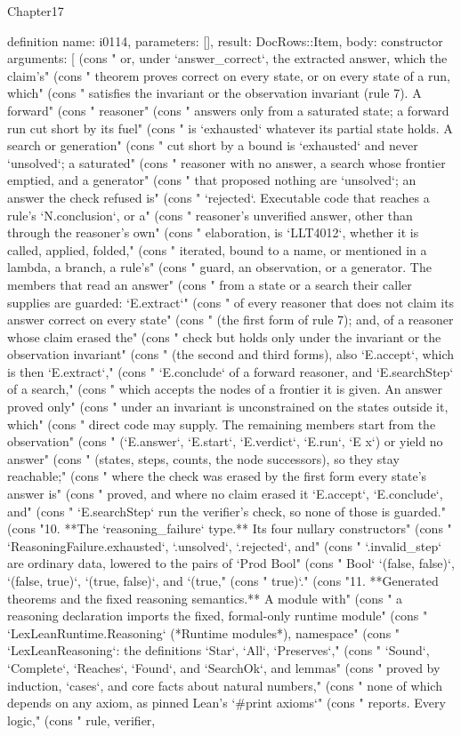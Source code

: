 \begin{lexlean}{Chapter17}
\begin{semanticmodule}
definition{
  name: i0114,
  parameters: [],
  result: DocRows::Item,
  body: constructor{
    arguments: [
      (cons "   or, under `answer_correct`, the extracted answer, which the claim's" (cons "   theorem proves correct on every state, or on every state of a run, which" (cons "   satisfies the invariant or the observation invariant (rule 7). A forward" (cons "   reasoner" (cons "   answers only from a saturated state; a forward run cut short by its fuel" (cons "   is `exhausted` whatever its partial state holds. A search or generation" (cons "   cut short by a bound is `exhausted` and never `unsolved`; a saturated" (cons "   reasoner with no answer, a search whose frontier emptied, and a generator" (cons "   that proposed nothing are `unsolved`; an answer the check refused is" (cons "   `rejected`. Executable code that reaches a rule's `N.conclusion`, or a" (cons "   reasoner's unverified answer, other than through the reasoner's own" (cons "   elaboration, is `LLT4012`, whether it is called, applied, folded," (cons "   iterated, bound to a name, or mentioned in a lambda, a branch, a rule's" (cons "   guard, an observation, or a generator. The members that read an answer" (cons "   from a state or a search their caller supplies are guarded: `E.extract`" (cons "   of every reasoner that does not claim its answer correct on every state" (cons "   (the first form of rule 7); and, of a reasoner whose claim erased the" (cons "   check but holds only under the invariant or the observation invariant" (cons "   (the second and third forms), also `E.accept`, which is then `E.extract`," (cons "   `E.conclude` of a forward reasoner, and `E.searchStep` of a search," (cons "   which accepts the nodes of a frontier it is given. An answer proved only" (cons "   under an invariant is unconstrained on the states outside it, which" (cons "   direct code may supply. The remaining members start from the observation" (cons "   (`E.answer`, `E.start`, `E.verdict`, `E.run`, `E x`) or yield no answer" (cons "   (states, steps, counts, the node successors), so they stay reachable;" (cons "   where the check was erased by the first form every state's answer is" (cons "   proved, and where no claim erased it `E.accept`, `E.conclude`, and" (cons "   `E.searchStep` run the verifier's check, so none of those is guarded." (cons "10. **The `reasoning_failure` type.** Its four nullary constructors" (cons "    `ReasoningFailure.exhausted`, `.unsolved`, `.rejected`, and" (cons "    `.invalid_step` are ordinary data, lowered to the pairs of `Prod Bool" (cons "    Bool` `(false, false)`, `(false, true)`, `(true, false)`, and `(true," (cons "    true)`." (cons "11. **Generated theorems and the fixed reasoning semantics.** A module with" (cons "    a reasoning declaration imports the fixed, formal-only runtime module" (cons "    `LexLeanRuntime.Reasoning` (*Runtime modules*), namespace" (cons "    `LexLeanReasoning`: the definitions `Star`, `All`, `Preserves`," (cons "    `Sound`, `Complete`, `Reaches`, `Found`, and `SearchOk`, and lemmas" (cons "    proved by induction, `cases`, and core facts about natural numbers," (cons "    none of which depends on any axiom, as pinned Lean's `#print axioms`" (cons "    reports. Every logic," (cons "    rule, verifier, }}
\end{semanticmodule}
\end{lexlean}
